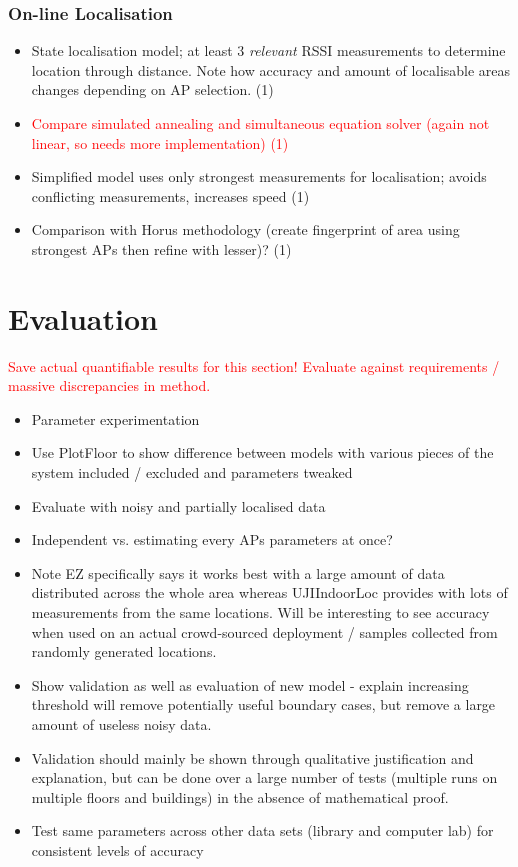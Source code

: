 \documentclass{UoYCSproject}
\begin{document}
            \subsection{On-line Localisation}
            
                \begin{itemize}
                    \item State localisation model; at least 3 \emph{relevant} RSSI measurements to determine location through distance. Note how accuracy and amount of localisable areas changes depending on AP selection. (1)
                    \item \textcolor{red}{Compare simulated annealing and simultaneous equation solver (again not linear, so needs more implementation) (1)}
                    \item Simplified model uses only strongest measurements for localisation; avoids conflicting measurements, increases speed (1)
                    \item Comparison with Horus methodology (create fingerprint of area using strongest APs then refine with lesser)? (1)
                \end{itemize}
        
	\chapter{Evaluation}
    \label{chap:eval}
	
		\textcolor{red}{Save actual quantifiable results for this section! Evaluate against requirements / massive discrepancies in method.}
		\begin{itemize}
			\item Parameter experimentation
			\item Use PlotFloor to show difference between models with various pieces of the system included / excluded and parameters tweaked
			\item Evaluate with noisy and partially localised data
            \item Independent vs. estimating every APs parameters at once?
			\item Note EZ specifically says it works best with a large amount of data distributed across the whole area whereas UJIIndoorLoc provides with lots of measurements from the same locations. Will be interesting to see accuracy when used on an actual crowd-sourced deployment / samples collected from randomly generated locations.
			\item Show validation as well as evaluation of new model - explain increasing threshold will remove potentially useful boundary cases, but remove a large amount of useless noisy data.
			\item Validation should mainly be shown through qualitative justification and explanation, but can be done over a large number of tests (multiple runs on multiple floors and buildings) in the absence of mathematical proof.
			\item Test same parameters across other data sets (library and computer lab) for consistent levels of accuracy
		\end{itemize}
		
\end{document}
